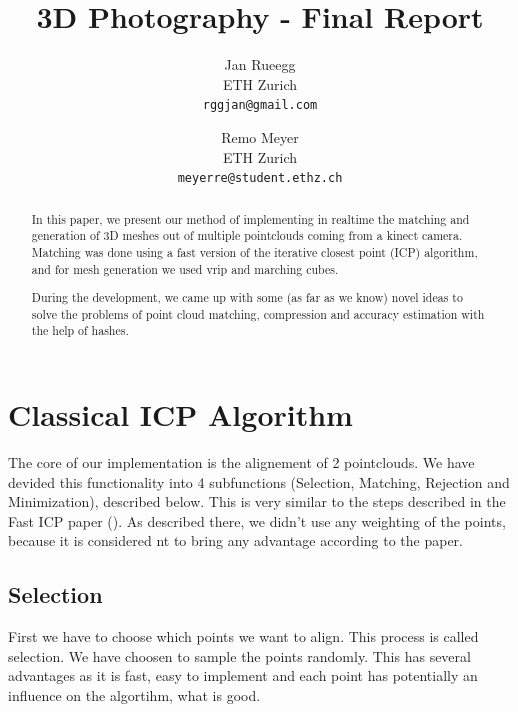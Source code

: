 \documentclass[10pt,twocolumn,letterpaper]{article}
\begin{document}
\title{3D Photography - Final Report}

\author{Jan Rueegg\\
ETH Zurich\\
{\tt\small rggjan@gmail.com}
\and
Remo Meyer\\
ETH Zurich\\
{\tt\small meyerre@student.ethz.ch}
}

\maketitle
\thispagestyle{empty}

\begin{abstract}
In this paper, we present our method of implementing in realtime the matching and generation of 3D meshes out of multiple pointclouds coming from a kinect
camera. Matching was done using a fast version of the iterative closest point (ICP) algorithm, and for mesh generation we used vrip and marching cubes.

During the development, we came up with some (as far as we know) novel ideas to solve the problems of point cloud matching, compression and accuracy
estimation with the help of hashes.
\end{abstract}

\section{Classical ICP Algorithm}
The core of our implementation is the alignement of 2 pointclouds. 
We have devided this functionality into 4 subfunctions (Selection, Matching, Rejection and Minimization), described below. This is very
similar to the steps described in the Fast ICP paper (\cite{fasticp}). As described there, we didn't use any weighting of the points,
because it is considered nt to bring any advantage according to the paper.

\subsection{Selection}
First we have to choose which points we want to align. This process is called selection. 
We have choosen to sample the points randomly. 
This has several advantages as it is fast, easy to implement and each point has potentially an influence on the algortihm, what is good.
\end{document}
